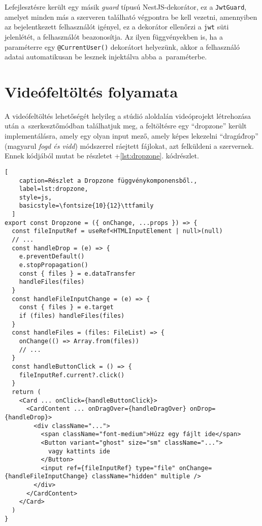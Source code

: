 Lefejlesztésre került egy másik \emph{guard} típusú NestJS-dekorátor, ez a \verb|JwtGuard|, amelyet minden más a szerveren található végpontra be kell vezetni, amennyiben az bejelentkezett felhasználót igényel, ez a dekorátor ellenőrzi a \verb|jwt| süti jelenlétét, a felhasználót beazonosítja. Az ilyen függvényekben is, ha a paraméterre egy \verb|@CurrentUser()| dekorátort helyezünk, akkor a felhasználó adatai automatikusan be lesznek injektálva abba a~paraméterbe.

\section{Videófeltöltés folyamata}

A videófeltöltés lehetőségét helyileg a stúdió aloldalán videóprojekt létrehozása után a~szerkesztőmódban találhatjuk meg, a feltöltésre egy ``dropzone'' került implementálásra, amely egy olyan input mező, amely képes lekezelni ``drag\'n\'drop'' (magyarul \emph{fogd és vidd}) módszerrel ráejtett fájlokat, azt felküldeni a szervernek. Ennek kódjából mutat be részletet \az+\ref{lst:dropzone}. kódrészlet.

\begin{minipage}{0.92\textwidth}
  \begin{lstlisting}[
    caption=Részlet a Dropzone függvénykomponensből.,
    label=lst:dropzone,
    style=js,
    basicstyle=\fontsize{10}{12}\ttfamily
  ]
export const Dropzone = ({ onChange, ...props }) => {
  const fileInputRef = useRef<HTMLInputElement | null>(null)
  // ...
  const handleDrop = (e) => {
    e.preventDefault()
    e.stopPropagation()
    const { files } = e.dataTransfer
    handleFiles(files)
  }
  const handleFileInputChange = (e) => {
    const { files } = e.target
    if (files) handleFiles(files)
  }
  const handleFiles = (files: FileList) => {
    onChange(() => Array.from(files))
    // ...
  }
  const handleButtonClick = () => {
    fileInputRef.current?.click()
  }
  return (
    <Card ... onClick={handleButtonClick}>
      <CardContent ... onDragOver={handleDragOver} onDrop={handleDrop}>
        <div className="...">
          <span className="font-medium">Húzz egy fájlt ide</span>
          <Button variant="ghost" size="sm" className="...">
            vagy kattints ide
          </Button>
          <input ref={fileInputRef} type="file" onChange={handleFileInputChange} className="hidden" multiple />
        </div>
      </CardContent>
    </Card>
  )
}
\end{lstlisting}
\end{minipage}

